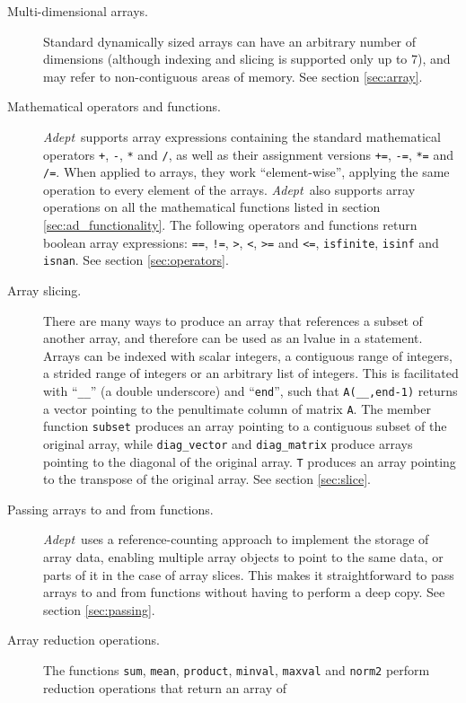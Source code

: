 \documentclass[a4,oneside]{book}
\def\codesize{\small}
\def\Adept{\emph{Adept}}
\def\code#1{{\codesize\texttt{#1}}}
\begin{document}
\begin{description}
\item[Multi-dimensional arrays.]  Standard dynamically sized arrays
  can have an arbitrary number of dimensions (although indexing and
  slicing is supported only up to 7), and may refer to non-contiguous
  areas of memory. See section \ref{sec:array}.
\item[Mathematical operators and functions.] \Adept\ supports array
  expressions containing the standard mathematical operators \code{+},
  \code{-}, \code{*} and \code{/}, as well as their assignment
  versions \code{+=}, \code{-=}, \code{*=} and \code{/=}. When applied
  to arrays, they work ``element-wise'', applying the same operation
  to every element of the arrays. \Adept\ also supports array
  operations on all the mathematical functions listed in section
  \ref{sec:ad_functionality}. The following operators and functions
  return boolean array expressions: \code{==}, \code{!=}, \code{>},
  \code{<}, \code{>=} and \code{<=}, \code{isfinite}, \code{isinf} and
  \code{isnan}.  See section \ref{sec:operators}.
\item[Array slicing.] There are many ways to produce an array that
  references a subset of another array, and therefore can be used as
  an lvalue in a statement. Arrays can be indexed with scalar
  integers, a contiguous range of integers, a strided range of
  integers or an arbitrary list of integers.  This is facilitated with
  ``\code{\_\_}'' (a double underscore) and ``\code{end}'', such that
  \code{A(\_\_,end-1)} returns a vector pointing to the penultimate
  column of matrix \code{A}. The member function \code{subset}
  produces an array pointing to a contiguous subset of the original
  array, while \code{diag\_vector} and \code{diag\_matrix} produce
  arrays pointing to the diagonal of the original array.  \code{T}
  produces an array pointing to the transpose of the original array.
  See section \ref{sec:slice}.
\item[Passing arrays to and from functions.] \Adept\ uses a
  reference-counting approach to implement the storage of array data,
  enabling multiple array objects to point to the same data, or parts
  of it in the case of array slices. This makes it straightforward to
  pass arrays to and from functions without having to perform a deep
  copy. See section \ref{sec:passing}.
\item[Array reduction operations.] The functions \code{sum},
  \code{mean}, \code{product}, \code{minval}, \code{maxval} and
  \code{norm2} perform reduction operations that return an array of

\end{description}
\end{document}
